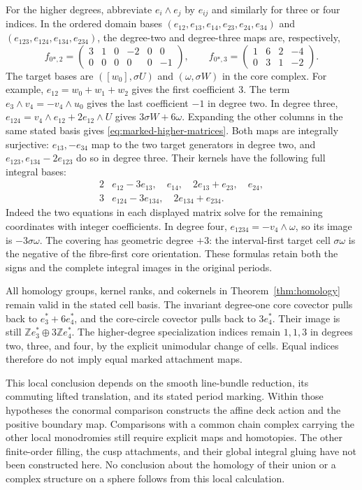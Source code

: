 For the higher degrees, abbreviate $e_i\wedge e_j$ by $e_{ij}$
and similarly for three or four indices. In the ordered domain
bases $(e_{12},e_{13},e_{14},e_{23},e_{24},e_{34})$ and
$(e_{123},e_{124},e_{134},e_{234})$, the degree-two and
degree-three maps are, respectively,
\begin{equation}\label{eq:marked-higher-matrices}
 f_{0*,2}=\begin{pmatrix}3&1&0&-2&0&0\\0&0&0&0&0&-1\end{pmatrix},
 \qquad
 f_{0*,3}=\begin{pmatrix}1&6&2&-4\\0&3&1&-2\end{pmatrix}.
\end{equation}
The target bases are $([w_0],\sigma U)$ and
$(\omega,\sigma W)$ in the core complex. For example,
$e_{12}=w_0+w_1+w_2$ gives the first coefficient $3$.
The term $e_3\wedge v_4=-v_4\wedge u_0$ gives the last
coefficient $-1$ in degree two. In degree three,
$e_{124}=v_4\wedge e_{12}+2e_{12}\wedge U$
gives $3\sigma W+6\omega$. Expanding the other columns
in the same stated basis gives \eqref{eq:marked-higher-matrices}.
Both maps are integrally surjective: $e_{13},-e_{34}$ map to
the two target generators in degree two, and
$e_{123},e_{134}-2e_{123}$ do so in degree three.
Their kernels have the following full integral bases:
\[
 \begin{array}{c|l}
 2&e_{12}-3e_{13},\quad e_{14},\quad 2e_{13}+e_{23},\quad e_{24},\\
 3&e_{124}-3e_{134},\quad 2e_{134}+e_{234}.
 \end{array}
\]
Indeed the two equations in each displayed matrix solve for the
remaining coordinates with integer coefficients. In degree four,
$e_{1234}=-v_4\wedge\omega$, so its image is $-3\sigma\omega$.
The covering has geometric degree $+3$: the interval-first target
cell $\sigma\omega$ is the negative of the fibre-first core
orientation. These formulas retain both the signs and the complete
integral images in the original periods.

All homology groups, kernel ranks, and cokernels in
Theorem~\ref{thm:homology} remain valid in the stated cell basis.
The invariant degree-one core covector pulls back to
$e_3^*+6e_4^*$, and the core-circle covector pulls back to
$3e_4^*$. Their image is still
$\mathbb Ze_3^*\oplus3\mathbb Ze_4^*$. The higher-degree
specialization indices remain $1,1,3$ in degrees two, three,
and four, by the explicit unimodular change of cells.
Equal indices therefore do not imply equal marked attachment maps.

This local conclusion depends on the smooth line-bundle reduction,
its commuting lifted translation, and its stated period marking.
Within those hypotheses the conormal comparison constructs the
affine deck action and the positive boundary map. Comparisons with
a common chain complex carrying the other local monodromies still
require explicit maps and homotopies. The other finite-order filling,
the cusp attachments, and their global integral gluing have not been
constructed here. No conclusion about the homology of their union
or a complex structure on a sphere follows from this local calculation.
